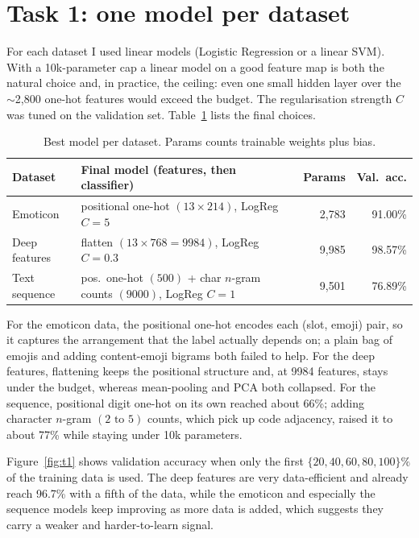 \documentclass[10pt]{article}
\begin{document}
\section{Task 1: one model per dataset}
For each dataset I used linear models (Logistic Regression or a linear SVM). With a 10k-parameter cap a
linear model on a good feature map is both the natural choice and, in practice, the ceiling: even one small
hidden layer over the $\sim$2{,}800 one-hot features would exceed the budget. The regularisation strength
$C$ was tuned on the validation set. Table~\ref{tab:t1} lists the final choices.

\begin{table}[h]
\centering\small
\begin{tabular}{@{}llrr@{}}
\toprule
Dataset & Final model (features, then classifier) & Params & Val.\ acc. \\
\midrule
Emoticon & positional one-hot $(13{\times}214)$, LogReg $C{=}5$ & 2{,}783 & 91.00\% \\
Deep features & flatten $(13{\times}768{=}9984)$, LogReg $C{=}0.3$ & 9{,}985 & 98.57\% \\
Text sequence & pos.\ one-hot $(500)$ + char $n$-gram counts $(9000)$, LogReg $C{=}1$ & 9{,}501 & 76.89\% \\
\bottomrule
\end{tabular}
\caption{Best model per dataset. Params counts trainable weights plus bias.}
\label{tab:t1}
\end{table}

For the emoticon data, the positional one-hot encodes each (slot, emoji) pair, so it captures the
arrangement that the label actually depends on; a plain bag of emojis and adding content-emoji bigrams both
failed to help. For the deep features, flattening keeps the positional structure and, at 9984 features,
stays under the budget, whereas mean-pooling and PCA both collapsed. For the sequence, positional digit
one-hot on its own reached about 66\%; adding character $n$-gram $(2\text{ to }5)$ counts, which pick up
code adjacency, raised it to about 77\% while staying under 10k parameters.

Figure~\ref{fig:t1} shows validation accuracy when only the first $\{20,40,60,80,100\}\%$ of the training
data is used. The deep features are very data-efficient and already reach 96.7\% with a fifth of the data,
while the emoticon and especially the sequence models keep improving as more data is added, which suggests
they carry a weaker and harder-to-learn signal.
\end{document}
